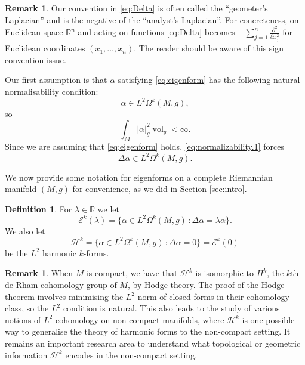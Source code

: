 \documentclass{article}
\theoremstyle{definition}
\newtheorem{dfn}[thm]{Definition}
\newtheorem{rmk}[thm]{Remark}
\numberwithin{thm}{section}
\numberwithin{equation}{section}
\DeclareMathOperator\vol{vol}
\def\R{\mathbb{R}}
\begin{document}
\begin{rmk}
Our convention in \eqref{eq:Delta} is often called the ``geometer's Laplacian'' and is the negative of the ``analyst's Laplacian''.  For concreteness, on Euclidean space $\mathbb{R}^n$ and acting on functions \eqref{eq:Delta} becomes $-\sum_{j=1}^n\frac{\partial^2}{\partial x_j^2}$ for Euclidean coordinates $(x_1,\ldots,x_n)$.  The reader should be aware of this sign convention issue.
\end{rmk}

Our first assumption is that $\alpha$ satisfying \eqref{eq:eigenform} has the following natural normalisability condition:
\begin{equation}\label{eq:normalizability.1}
    \alpha\in L^2\Omega^k(M,g),
\end{equation}
so
\begin{equation}
    \int_M|\alpha|^2_g\vol_g<\infty.
\end{equation}
Since we are assuming that \eqref{eq:eigenform} holds, \eqref{eq:normalizability.1} forces 
\begin{equation}\label{eq:normalizability.2}
    \Delta\alpha\in L^2\Omega^k(M,g).
\end{equation}

We now provide some notation for eigenforms on a complete Riemannian manifold $(M,g)$ for convenience, as we did in Section \ref{sec:intro}.

\begin{dfn}\label{dfn:eigenforms}
For $\lambda\in\R$ we let
\begin{equation}
    \mathcal{E}^k(\lambda)=\{\alpha\in L^2\Omega^k(M,g)\,\colon \Delta\alpha=\lambda\alpha\}.
\end{equation}
We also let
\begin{equation}
    \mathcal{H}^k=\{\alpha\in L^2\Omega^k(M,g)\,\colon \Delta\alpha=0\}=\mathcal{E}^k(0)
\end{equation}
be the $L^2$ harmonic $k$-forms.
\end{dfn}

\begin{rmk}
    When $M$ is compact, we have that $\mathcal{H}^k$ is isomorphic to $H^k$, the $k$th de Rham cohomology group of $M$, by Hodge theory.  The proof of the Hodge theorem involves minimising the $L^2$ norm of closed forms  in their cohomology class, so the $L^2$ condition is natural.  This also leads to the study of various notions of $L^2$ cohomology on non-compact manifolds, where $\mathcal{H}^k$ is one possible way to generalise the theory of harmonic forms to the non-compact setting.  It remains an important research area to understand what topological or geometric information $\mathcal{H}^k$ encodes in the non-compact setting.
    \end{rmk}
\end{document}
